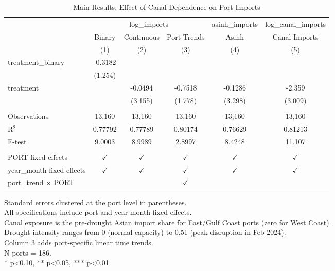 \begin{table}[htbp]
   \caption{\label{tab:main} Main Results: Effect of Canal Dependence on Port Imports}
   \bigskip
   \centering
   \begin{adjustbox}{max width=\textwidth}
\begin{tabular}{lccccc}
      \toprule
       & \multicolumn{3}{c}{log\_imports} & asinh\_imports & log\_canal\_imports\\
                                   & Binary        & Continuous    & Port Trends   & Asinh         & Canal Imports \\   
                                   & (1)           & (2)           & (3)           & (4)           & (5)\\  
      \midrule 
      treatment\_binary            & -0.3182       &               &               &               &   \\   
                                   & (1.254)       &               &               &               &   \\   
      treatment                    &               & -0.0494       & -0.7518       & -0.1286       & -2.359\\   
                                   &               & (3.155)       & (1.778)       & (3.298)       & (3.009)\\   
       \\
      Observations                 & 13,160        & 13,160        & 13,160        & 13,160        & 13,160\\  
      R$^2$                        & 0.77792       & 0.77789       & 0.80174       & 0.76629       & 0.81213\\  
      F-test                       & 9.0003        & 8.9989        & 2.8997        & 8.4248        & 11.107\\  
       \\
      PORT fixed effects           & $\checkmark$  & $\checkmark$  & $\checkmark$  & $\checkmark$  & $\checkmark$\\   
      year\_month fixed effects    & $\checkmark$  & $\checkmark$  & $\checkmark$  & $\checkmark$  & $\checkmark$\\   
      port\_trend $\times $ PORT   &               &               & $\checkmark$  &               & \\  
      \bottomrule
   \end{tabular}
\end{adjustbox}
   
   \par \raggedright 
   Standard errors clustered at the port level in parentheses.\\
   All specifications include port and year-month fixed effects.\\
   Canal exposure is the pre-drought Asian import share for East/Gulf Coast ports (zero for West Coast).\\
   Drought intensity ranges from 0 (normal capacity) to 0.51 (peak disruption in Feb 2024).\\
   Column 3 adds port-specific linear time trends.\\
   N ports = 186.\\
   * p<0.10, ** p<0.05, *** p<0.01.
\end{table}
